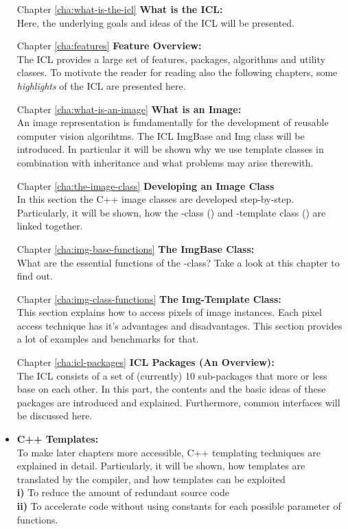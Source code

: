 \begin{itemize}
\item [Chapter \ref{cha:what-is-the-icl}] \textbf{What is the ICL:}\\ Here, the underlying goals and ideas of the ICL will be presented.
\item [Chapter \ref{cha:features}] \textbf{Feature Overview:}\\ The ICL provides a large set of features, packages, algorithms and utility classes. To motivate the reader for reading also the following chapters, some \emph{highlights} of the ICL are presented here.
\item [Chapter \ref{cha:what-is-an-image}] \textbf{What is an Image:}\\ An image representation is fundamentally for the development of reusable computer vision algorihtms. The ICL ImgBase  and Img  class will be introduced. In particular it will be shown why we use template classes in combination with inheritance and what problems may arise therewith. 
\item [Chapter \ref{cha:the-image-class}]\textbf{Developing an Image Class}\\
In this section the C++ image classes are developed step-by-step. Particularly, it will be shown, how the -class () and -template class () are linked together. 
\item [Chapter \ref{cha:img-base-functions}]\textbf{The ImgBase Class:}\\
What are the essential functions of the -class? Take a look at this chapter to find out.
\item [Chapter \ref{cha:img-class-functions}]\textbf{The Img-Template Class:}\\
This section explains how to access pixels of image instances. Each pixel access technique has it's advantages and disadvantages. This section provides a lot of examples and benchmarks for that.
\item [Chapter \ref{cha:icl-packages}]\textbf{ICL Packages (An Overview):}\\ The ICL consists of a set of (currently) 10 sub-packages that more or less base on each other. In this part, the contents and the basic ideas of these packages are introduced and explained. Furthermore, common interfaces will be discussed here.
\item \textbf{C++ Templates:}\\ To make later chapters more accessible, C++ templating techniques are explained in detail. Particularly, it will be shown, how templates are translated by the compiler, and how templates can be exploited\\
\small{\textbf{i)}} To reduce the amount of redundant source code\\
\small{\textbf{ii)}} To accelerate code without using constants for each possible parameter of functions.    


\end{itemize}
